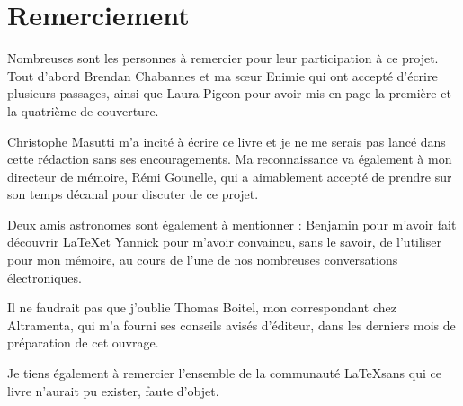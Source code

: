 \section*{Remerciement}\thispagestyle{plain}

Nombreuses sont les personnes à remercier pour leur participation à ce projet. Tout d'abord Brendan Chabannes et ma sœur Enimie qui ont accepté d'écrire plusieurs passages, ainsi que Laura Pigeon pour avoir mis en page la première et la quatrième de couverture.

Christophe Masutti m'a incité à écrire ce livre et je ne me serais pas lancé dans cette rédaction sans ses encouragements. Ma reconnaissance va également à mon directeur de mémoire, Rémi Gounelle, qui a aimablement accepté de prendre sur son temps décanal pour discuter de ce projet.

Deux amis astronomes sont également à mentionner : Benjamin pour m'avoir fait découvrir  \LaTeX et Yannick pour m'avoir convaincu, sans le savoir, de l'utiliser pour mon mémoire, au cours de l'une de nos nombreuses conversations électroniques.

Il ne faudrait pas que j'oublie Thomas Boitel, mon correspondant chez Altramenta, qui m'a fourni ses conseils avisés d'éditeur, dans les derniers mois de préparation de cet ouvrage.

Je tiens également à remercier l'ensemble de la communauté \LaTeX sans qui ce livre n'aurait pu exister, faute d'objet. 

